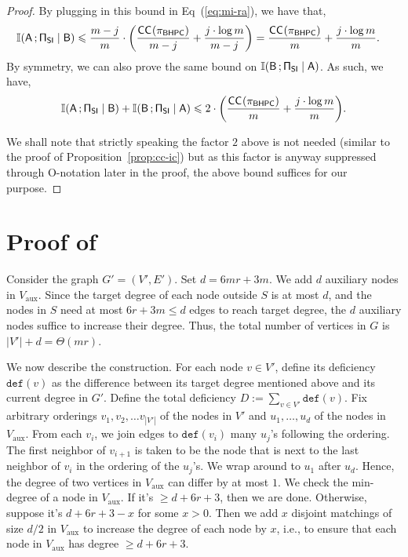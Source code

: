\documentclass[11pt,letterpaper]{article}
\renewcommand{\geq}{\geqslant}
\renewcommand{\leq}{\leqslant}
\theoremstyle{definition}
\newcommand{\bhpc}{\ensuremath{\textnormal{\textsf{BHPC}}}\xspace}
\newcommand{\defc}{\mathtt{def}}
\newcommand{\Vaux}{V_{\text{aux}}}
\newcommand{\paren}[1]{\ensuremath{\mleft(#1\mright)}\xspace}
\newcommand{\Prot}{\ensuremath{\Pi}}
\newcommand{\prot}{\ensuremath{\pi}}
\newcommand{\rA}{\rv{A}}
\newcommand{\rB}{\rv{B}}
\newcommand{\rv}[1]{\ensuremath{\mathsf{#1}}}
\newcommand{\II}{\ensuremath{\mathbb{I}}}
\newcommand{\mi}[2]{\ensuremath{\II(#1 \,; #2)}}
\newcommand{\rProtSI}{\ensuremath{\rv{\Prot}}_{\ensuremath{\textnormal{\textsf{SI}}}}\xspace}
\newcommand{\CC}[2]{\ensuremath{\textnormal{\textsf{CC}}_{#2}(#1)}\xspace}
\begin{document}
\begin{proof}
By plugging in this bound in Eq~(\ref{eq:mi-ra}), we have that,
\begin{align*}
	\mi{\rA}{\rProtSI \mid \rB} &\leq \frac{m-j}{m} \cdot \paren{\frac{\CC{\prot_\bhpc}{} }{m-j}   + \frac{j \cdot \log{m}}{m-j}} = \frac{\CC{\prot_\bhpc}{} }{m}   + \frac{j \cdot \log{m}}{m}. 
\end{align*}
By symmetry, we can also prove the same bound on $\mi{\rB}{\rProtSI \mid \rA}$. As such, we have,
\begin{align*}
	\mi{\rA}{\rProtSI \mid \rB} + \mi{\rB}{\rProtSI \mid \rA} \leq 2 \cdot \paren{\frac{\CC{\prot_\bhpc}{} }{m}   + \frac{j \cdot \log{m}}{m}}.
\end{align*}

We shall note that strictly speaking the factor $2$ above is not needed (similar to the proof of Proposition~\ref{prop:cc-ic}) but as this factor is anyway suppressed through O-notation later in the proof, the above bound
suffices for our purpose. %

\end{proof}

\section{Proof of \texorpdfstring{}{Claim}}\label{app:proof-auxnode-redn}
    Consider the graph $G'=(V',E')$. Set $d=6mr+3m$. We add $d$ auxiliary nodes in $\Vaux$. Since the target degree of each node outside $S$ is at most $d$, and the nodes in $S$ need at most $6r+3m\leq d$ edges to reach target degree, the $d$ auxiliary nodes suffice to increase their degree. Thus, the total number of vertices in $G$ is $|V'|+d=\Theta(mr)$. 
    
    We now describe the construction. For each node $v\in V'$, define its deficiency $\defc(v)$ as the difference between its target degree mentioned above and its current degree in $G'$. Define the total deficiency $D:= \sum_{v\in V'} \defc(v)$.  Fix arbitrary orderings $v_1,v_2,\ldots v_{|V'|}$ of the nodes in $V'$ and $u_1,\ldots,u_d$ of the nodes in $\Vaux$. From each $v_i$, we join edges to $\defc(v_i)$ many $u_j$'s following the ordering. The first neighbor of $v_{i+1}$ is taken to be the node that is next to the last neighbor of $v_i$ in the ordering of the $u_j$'s. We wrap around to $u_1$ after $u_d$. Hence, the degree of two vertices in $\Vaux$ can differ by at most $1$. We check the min-degree of a node in $\Vaux$. If it's $\geq d+6r+3$, then we are done. Otherwise, suppose it's $d+6r+3-x$ for some $x>0$. Then we add $x$ disjoint matchings of size $d/2$ in $\Vaux$ to increase the degree of each node by $x$, i.e., to ensure that each node in $\Vaux$ has degree $\geq d+6r+3$.  
\end{document}
